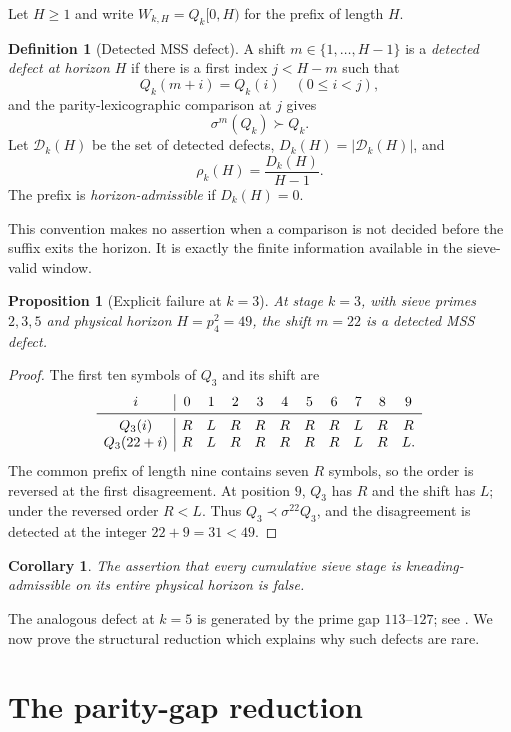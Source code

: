 \documentclass[11pt]{article}
\newtheorem{proposition}[theorem]{Proposition}
\newtheorem{corollary}[theorem]{Corollary}
\theoremstyle{definition}
\newtheorem{definition}[theorem]{Definition}
\theoremstyle{remark}
\newcommand{\cD}{\mathcal{D}}
\newcommand{\sh}{\sigma}
\begin{document}
Let $H\ge1$ and write $W_{k,H}=Q_k[0,H)$ for the prefix of length $H$.

\begin{definition}[Detected MSS defect]\label{def:defect}
A shift $m\in\{1,\ldots,H-1\}$ is a \emph{detected defect at horizon $H$} if there is a first index $j<H-m$ such that
\[
    Q_k(m+i)=Q_k(i)\quad(0\le i<j),
\]
and the parity-lexicographic comparison at $j$ gives
\[
    \sh^m(Q_k)\succ Q_k.
\]
Let $\cD_k(H)$ be the set of detected defects, $D_k(H)=|\cD_k(H)|$, and
\[
    \rho_k(H)=\frac{D_k(H)}{H-1}.
\]
The prefix is \emph{horizon-admissible} if $D_k(H)=0$.
\end{definition}

This convention makes no assertion when a comparison is not decided before the suffix exits the horizon.  It is exactly the finite information available in the sieve-valid window.

\begin{proposition}[Explicit failure at $k=3$]\label{prop:k3-defect}
At stage $k=3$, with sieve primes $2,3,5$ and physical horizon $H=p_4^2=49$, the shift $m=22$ is a detected MSS defect.
\end{proposition}

\begin{proof}
The first ten symbols of $Q_3$ and its shift are
\[
\begin{array}{c|cccccccccc}
 i&0&1&2&3&4&5&6&7&8&9\\
 \midrule
 Q_3(i)&R&L&R&R&R&R&R&L&R&R\\
 Q_3(22+i)&R&L&R&R&R&R&R&L&R&L.
\end{array}
\]
The common prefix of length nine contains seven $R$ symbols, so the order is reversed at the first disagreement.  At position $9$, $Q_3$ has $R$ and the shift has $L$; under the reversed order $R<L$.  Thus $Q_3\prec\sh^{22}Q_3$, and the disagreement is detected at the integer $22+9=31<49$.
\end{proof}

\begin{corollary}
The assertion that every cumulative sieve stage is kneading-admissible on its entire physical horizon is false.
\end{corollary}

The analogous defect at $k=5$ is generated by the prime gap $113$--$127$; see \citet{WangTransient2026}.  We now prove the structural reduction which explains why such defects are rare.

\section{The parity-gap reduction}
\end{document}
